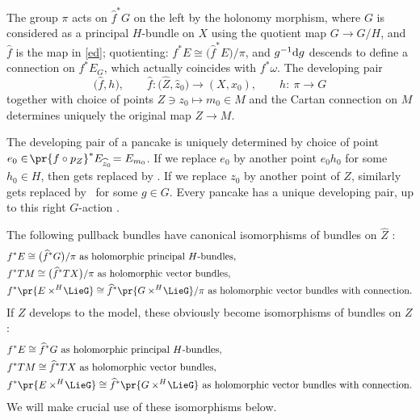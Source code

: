 \documentclass[pdftex]{sigma}
\numberwithin{equation}{section}
\newcommand{\amal}[3]{\ensuremath{{#1} \mathbin{\times^{#2}} \! #3}}
\begin{document}
The group $\pi$ acts on $\widehat{f}^* G$ on the left by the holonomy morphism,
where $G$ is considered as a principal $H$-bundle on $X$ using the quotient map
$G \longrightarrow G/H$, and $\widehat{f}$ is the map in \eqref{ed}; quotienting: $f^*E \cong \big(\widehat{f}^*E\big)/\pi$, and $g^{-1} {\rm d}g$ descends to define a connection on $f^*E_G$, which actually coincides with $f^*\omega$. The developing pair
\[
\big(\widehat{f}, h\big), \qquad
\widehat{f} \colon \big(\widehat{Z}, \widehat{z}_0\big) \to (X, x_0),\qquad
h \colon\ \pi \to G
\]
together with choice of points $Z \ni z_0 \longmapsto m_0 \in M$ and the Cartan connection on $M$ determines uniquely
the original map $Z \to M$.

The developing pair of a pancake is uniquely determined by choice of point $e_0 \in \! \pr{f \circ p_Z} ^* E_{\widehat{z}_0}
 \!= E_{m_0}$. If we replace $e_0$ by another point $e_0 h_0$ for some $h_0 \in H$, then
 gets replaced by .
If we replace $z_0$ by another point of $Z$, similarly  gets replaced by~ for some $g \in G$.
Every pancake has a unique developing pair, up to this right $G$-action \cite[Section~2.3]{Biswas.McKay:2016}.

The following pullback bundles have canonical isomorphisms of bundles on $\hat{Z}$ \cite[Section~2.3]{Biswas.McKay:2016}:
\begin{gather*}
\begin{split}
&f^* E \cong \big(\widehat{f}^* G\big)/\pi \text{ as holomorphic principal $H$-bundles}, \\
&f^* TM \cong \big(\widehat{f}^* TX\big)/\pi \text{ as holomorphic vector bundles}, \\
&f^* \pr{\amal{E}{H}{\LieG}} \cong \widehat{f}^* \pr{\amal{G}{H}{\LieG}}/\pi \text{ as holomorphic vector bundles with connection}.
\end{split}
\end{gather*}
If $Z$ develops to the model, these obviously become isomorphisms of bundles on $Z$:
\begin{gather*}
\begin{split}
&f^* E \cong \widehat{f}^* G \text{ as holomorphic principal $H$-bundles}, \\
&f^* TM \cong \widehat{f}^* TX \text{ as holomorphic vector bundles}, \\
&f^* \pr{\amal{E}{H}{\LieG}} \cong \widehat{f}^* \pr{\amal{G}{H}{\LieG}} \text{ as holomorphic vector bundles with connection}.
\end{split}
\end{gather*}
We will make crucial use of these isomorphisms below.
\end{document}
